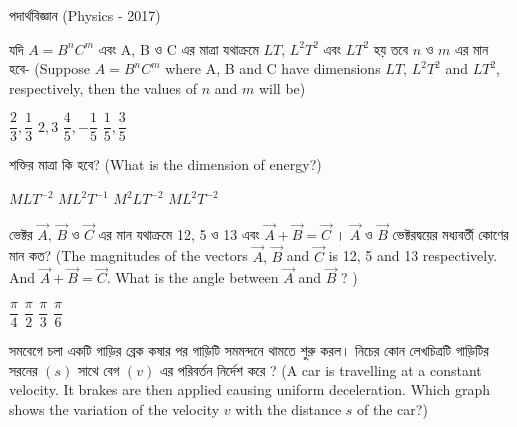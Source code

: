 \documentclass[addpoints]{exam}
\begin{document}
\begin{LARGE}
\begin{center}
পদার্থবিজ্ঞান (Physics - 2017)
\end{center}
\end{LARGE}
\begin{questions}

\question যদি $ A=B^{n}C^{m} $ এবং A, B ও C এর মাত্রা যথাক্রমে $ LT,\,L^{2}T^{2} $ এবং $ LT^{2} $ হয় তবে $ n $ ও $ m $ এর মান হবে- (Suppose $ A=B^{n}C^{m} $ where A, B and C have dimensions $ LT,\,L^{2}T^{2} $ and $ LT^{2} $, respectively, then the values of $ n $ and $ m $ will be)  

\begin{oneparchoices}
\choice $ \dfrac{2}{3}, \dfrac{1}{3} $
\choice $ 2,3 $
\choice $ \dfrac{4}{5}, -\dfrac{1}{5} $
\choice $ \dfrac{1}{5}, \dfrac{3}{5} $
\end{oneparchoices}

 \question  শক্তির মাত্রা কি হবে? (What is the dimension of energy?)

\begin{oneparchoices}
\choice $ MLT^{-2} $
\choice $ ML^{2}T^{-1} $
\choice $ M^{2}LT^{-2} $
\choice $ ML^{2}T^{-2} $

\end{oneparchoices}

\question ভেক্টর $ \vec{A},\,\vec{B} $ ও $ \vec{C} $ এর মান যথাক্রমে 12, 5 ও 13 এবং $ \vec{A}+\vec{B} = \vec{C} $ । $ \vec{A} $ ও $ \vec{B} $ ভেক্টরদ্বয়ের মধ্যবর্তী কোণের মান কত? (The magnitudes of the vectors $ \vec{A},\,\vec{B} $ and $ \vec{C} $ is 12, 5 and 13 respectively. And $ \vec{A}+\vec{B} = \vec{C} $. What is the angle between $ \vec{A} $ and $ \vec{B} $ ? )

\begin{oneparchoices}
\choice $ \dfrac{\pi}{4} $
\choice $ \dfrac{\pi}{2} $
\choice $ \dfrac{\pi}{3} $
\choice $ \dfrac{\pi}{6} $
\end{oneparchoices}

\question  সমবেগে চলা একটি গাড়ির ব্রেক কষার পর গাড়িটি সমমন্দনে থামতে শুরু করল। নিচের কোন লেখচিত্রটি গাড়িটির সরনের $ (s) $ সাথে বেগ $ (v) $ এর পরিবর্তন নির্দেশ করে ? (A car is travelling at a constant velocity. It brakes are then applied causing uniform deceleration. Which graph shows the variation of the velocity $ v $ with the distance $ s $ of the car?)


\end{questions}
\end{document}
